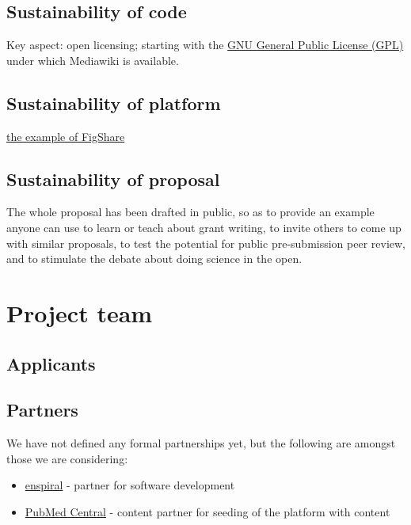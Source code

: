 \documentclass[final,authoryear,3p]{elsarticle-open-drafting}
\begin{document}
\subsection{Sustainability of code}
Key aspect: open licensing; starting with the \href{http://www.gnu.org/licenses/gpl.html}{GNU General Public License (GPL)} under which Mediawiki is available.

\subsection{Sustainability of platform}
\href{http://www.pawelszczesny.org/2011/03/02/systems-institute-is-officially-supporting-figshare-backstage-story/}{the example of FigShare}

\subsection{Sustainability of proposal}
The whole proposal has been drafted in public, so as to provide an example anyone can use 
to learn or teach about grant writing, to invite others to come up with similar proposals, to test the potential for public pre-submission peer review, and to stimulate the debate about doing science in the open.

\section{Project team}
\subsection{Applicants}
\subsection{Partners}
We have not defined any formal partnerships yet, but the following are amongst those we are considering:
\begin{itemize}
	\item \href{http://www.enspiral.com}{enspiral} - partner for software development
	\item \href{http://www.ncbi.nlm.nih.gov/pmc/}{PubMed Central} - content partner for seeding of the platform with content
	
\end{itemize}

\end{document}
